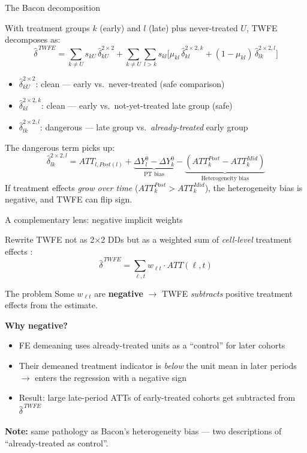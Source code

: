 \documentclass[aspectratio=169, 10pt]{beamer}
\begin{document}
\begin{frame}{The Bacon decomposition}

  With treatment groups $k$ (early) and $l$ (late) plus never-treated $U$, TWFE decomposes as:
  \[
    \hat\delta^{\,TWFE} = \sum_{k \neq U} s_{kU}\,\hat\delta_{kU}^{2\times2}
    + \sum_{k \neq U}\sum_{l > k} s_{kl}
      \Big[\mu_{kl}\,\hat\delta_{kl}^{2\times2,k} + (1-\mu_{kl})\,\hat\delta_{lk}^{2\times2,l}\Big]
  \]

  \begin{itemize}
    \item $\hat\delta_{kU}^{2\times2}$: clean — early vs.\ never-treated (safe comparison)
    \item $\hat\delta_{kl}^{2\times2,k}$: clean — early vs.\ not-yet-treated late group (safe)
    \item $\hat\delta_{lk}^{2\times2,l}$: \alert{dangerous} — late group vs.\ \emph{already-treated} early group
  \end{itemize}

  The dangerous term picks up:
  \[
    \hat\delta_{lk}^{2\times2,l} = ATT_{l,Post(l)} + \underbrace{\Delta Y^0_l - \Delta Y^0_k}_{\text{PT bias}}
    - \underbrace{(ATT_k^{Post} - ATT_k^{Mid})}_{\text{Heterogeneity bias}}
  \]
  If treatment effects \emph{grow over time} ($ATT_k^{Post} > ATT_k^{Mid}$), the heterogeneity bias is \alert{negative},
  and TWFE can \alert{flip sign}.

\end{frame}

\begin{frame}{A complementary lens: negative implicit weights}

  Rewrite TWFE not as 2$\times$2 DDs but as a weighted sum of
  \emph{cell-level} treatment effects \citep{deChaisemartin2020}:
  \[
    \hat\delta^{\,TWFE} = \sum_{\ell,t} w_{\ell t}\cdot ATT(\ell,t)
  \]

  \begin{alertblock}{The problem}
    Some $w_{\ell t}$ are \textbf{negative} $\rightarrow$ TWFE \emph{subtracts}
    positive treatment effects from the estimate.
  \end{alertblock}

  \smallskip
  \textbf{Why negative?}
  \begin{itemize}
    \item FE demeaning uses already-treated units as a ``control''
          for later cohorts
    \item Their demeaned treatment indicator is \emph{below} the unit mean
          in later periods $\rightarrow$ enters the regression with a negative sign
    \item Result: large late-period ATTs of early-treated cohorts get
          \alert{subtracted} from $\hat\delta^{\,TWFE}$
  \end{itemize}

  \smallskip
  \textbf{Note:} same pathology as Bacon's heterogeneity bias —
  two descriptions of ``already-treated as control''.

\end{frame}
\end{document}

